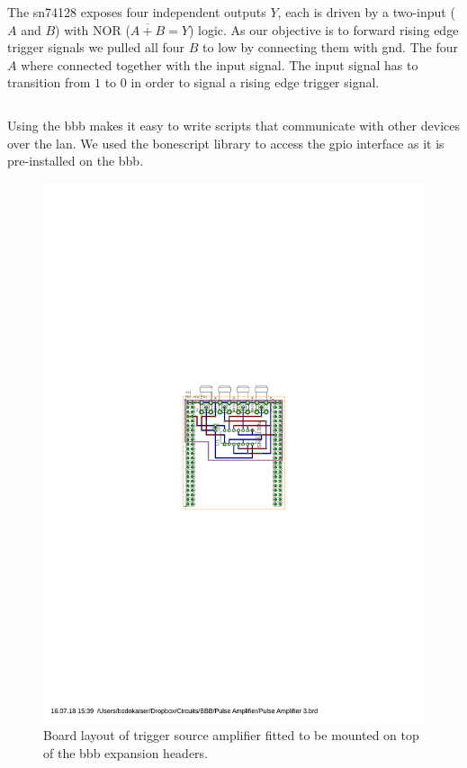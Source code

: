 The \gls{sn74128} exposes four independent outputs $Y$, each is driven by a
two-input ($A$ and $B$) with NOR ($\overline{A+B}=Y$) logic. As our objective
is to forward rising edge trigger signals we pulled all four $B$ to low by
connecting them with \gls{gnd}. The four $A$ where connected together with
the input signal. The input signal has to transition from $1$ to $0$ in order
to signal a rising edge trigger signal.

\begin{listing}[h]
  \inputminted[xleftmargin=.2\linewidth]{javascript}{scripts/trigger.js}
  \captionsetup{width=.6\linewidth}
  \caption{The script pulls the \gls{gpio} to high and starts a \gls{http}
    server assigned with a callback function that pulls the \gls{gpio} to low
  for one \SI{1}{\milli\second}.}
\end{listing}

Using the \gls{bbb} makes it easy to write scripts that communicate with
other devices over the \gls{lan}. We used the bonescript library to access
the \gls{gpio} interface as it is pre-installed on the \gls{bbb}.

\begin{figure}[h]
  \centering
  \captionsetup{width=.5\linewidth}
  \includegraphics[width=.3\textwidth]{images/circuit/line-driver/board.pdf}
  \caption{Board layout of trigger source amplifier fitted to be mounted on
  top of the \gls{bbb} expansion headers.}
\end{figure}
